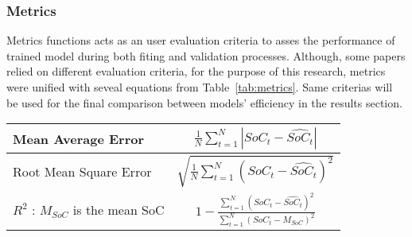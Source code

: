 \subsubsection{Metrics}
Metrics functions acts as an user evaluation criteria to asses the performance of trained model during both fiting and validation processes.
Although, some papers relied on different evaluation criteria, for the purpose of this research, metrics were unified with seveal equations from Table~\ref{tab:metrics}.
Same criterias will be used for the final comparison between models' efficiency in the results section.
    \begin{tabular}{l c}
        \hline
        Mean Average Error &  $\frac{1}{N}\sum\limits^N_{t=1} |SoC_t-\hat{SoC_t}|$ \\
        \hline
        Root Mean Square Error & $ \sqrt{\frac{1}{N}\sum\limits^N_{t=1} \left(SoC_t-\hat{SoC_t} \right)^2}$ \\
        \hline
        $R^2$ : $M_{SoC}$ is the mean SoC & $1-\frac{\sum\limits^N_{t=1}(SoC_t-\hat{SoC_t})^2}
                {\sum\limits^N_{t=1}(SoC_t-M_{SoC})^2}$ \\
    \end{tabular}

